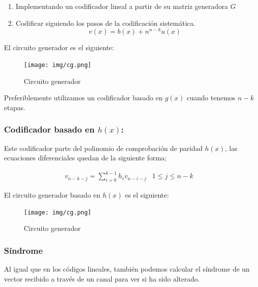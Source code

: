 \documentclass{article}
\begin{document}
\begin{enumerate}
    \item Implementando un codificador lineal a partir de su matriz generadora $G$
    \item Codificar siguiendo los pasos de la codificación sistemática.
    \begin{equation}
        v(x) = b(x)+n^{n-k}u(x)
    \end{equation}
\end{enumerate}

El circuito generador es el siguiente:

\begin{figure}[h]
    \texttt{[image: img/cg.png]}
    \caption{Circuito generador}
\end{figure}

Preferiblemente utilizamos un codificador basado en $g(x)$ cuando tenemos $n-k$ etapas.

\pagebreak

\subsubsection{Codificador basado en $h(x)$:}

Este codificador parte del polinomio de comprobación de paridad $h(x)$, las ecuaciones diferenciales quedan de la siguiente forma;

\begin{equation}
    \begin{array}{cc}
        v_{n-k-j} = \sum_{i=0}^{k-1}h_iv_{n-i-j} & 1\leq j \leq n-k
        
    \end{array}
\end{equation}

El circuito generador basado en $h(x)$ es el siguiente:

\begin{figure}[h]
    \texttt{[image: img/cg.png]}
    \caption{Circuito generador}
\end{figure}

\subsubsection{Síndrome}

Al igual que en los códigos lineales, también podemos calcular el síndrome de un vector recibido a través de un canal para ver si ha sido alterado.
\end{document}
